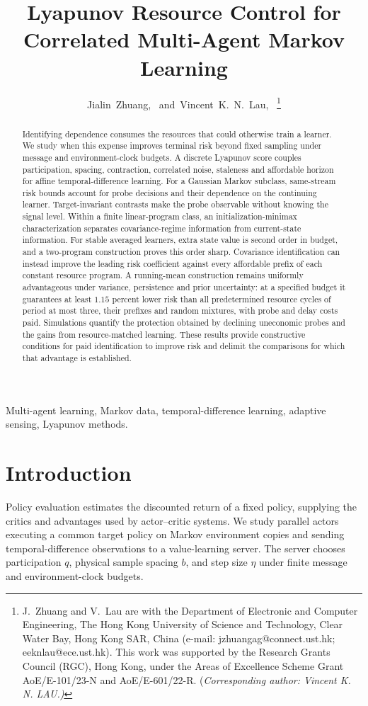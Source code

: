 \documentclass[journal]{IEEEtran}
\title{Lyapunov Resource Control for Correlated Multi-Agent Markov Learning}
\author{Jialin~Zhuang,~\IEEEmembership{Member,~IEEE,}
and~Vincent~K.~N.~Lau,~\IEEEmembership{Fellow,~IEEE}%
\thanks{J.~Zhuang and V.~Lau are with the Department of Electronic and Computer Engineering, The Hong Kong University of Science and Technology, Clear Water Bay, Hong Kong SAR, China (e-mail: \mbox{jzhuangag@connect.ust.hk}; \mbox{eeknlau@ece.ust.hk}).
This work was supported by the Research Grants Council (RGC), Hong Kong, under the Areas of Excellence Scheme Grant AoE/E-101/23-N and AoE/E-601/22-R.
(\em{Corresponding author: Vincent K. N. LAU}.)}
}
\begin{document}
\maketitle
\begin{abstract}
Identifying dependence consumes the resources that could otherwise train a learner.
We study when this expense improves terminal risk beyond fixed sampling under message and environment-clock budgets.
A discrete Lyapunov score couples participation, spacing, contraction, correlated noise, staleness and affordable horizon for affine temporal-difference learning.
For a Gaussian Markov subclass, same-stream risk bounds account for probe decisions and their dependence on the continuing learner.
Target-invariant contrasts make the probe observable without knowing the signal level.
Within a finite linear-program class, an initialization-minimax characterization separates covariance-regime information from current-state information.
For stable averaged learners, extra state value is second order in budget, and a two-program construction proves this order sharp.
Covariance identification can instead improve the leading risk coefficient against every affordable prefix of each constant resource program.
A running-mean construction remains uniformly advantageous under variance, persistence and prior uncertainty: at a specified budget it guarantees at least $1.15$ percent lower risk than all predetermined resource cycles of period at most three, their prefixes and random mixtures, with probe and delay costs paid.
Simulations quantify the protection obtained by declining uneconomic probes and the gains from resource-matched learning.
These results provide constructive conditions for paid identification to improve risk and delimit the comparisons for which that advantage is established.
\end{abstract}
\begin{IEEEkeywords}
Multi-agent learning, Markov data, temporal-difference learning, adaptive sensing, Lyapunov methods.
\end{IEEEkeywords}

\section{Introduction}
Policy evaluation estimates the discounted return of a fixed policy, supplying the critics and advantages used by actor--critic systems.
We study parallel actors executing a common target policy on Markov environment copies and sending temporal-difference observations to a value-learning server.
The server chooses participation $q$, physical sample spacing $b$, and step size $\eta$ under finite message and environment-clock budgets.
\end{document}
